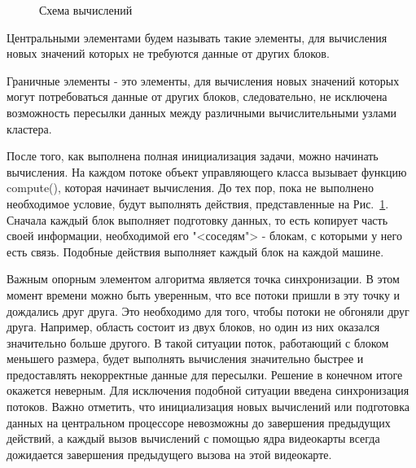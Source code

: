 \documentclass[a4paper, 14pt]{extarticle}
\theoremstyle{definition}
\begin{document}
\begin{figure}[h]
	\caption{Схема вычислений}
	\label{ris:scheme}
\end{figure}

\par Центральными элементами будем называть такие элементы, для вычисления новых значений которых не требуются данные от других блоков.

\par Граничные элементы - это элементы, для вычисления новых значений которых могут потребоваться данные от других блоков, следовательно, не исключена возможность пересылки данных между различными вычислительными узлами кластера.

\par После того, как выполнена полная инициализация задачи, можно начинать вычисления. На каждом потоке объект управляющего класса вызывает функцию compute(), которая начинает вычисления. До тех пор, пока не выполнено необходимое условие, будут выполнять действия, представленные на Рис.~\ref{ris:scheme}. Сначала каждый блок выполняет подготовку данных, то есть копирует часть своей информации, необходимой его  "<соседям"> - блокам, с которыми у него есть связь. Подобные действия выполняет каждый блок на каждой машине.

\par Важным опорным элементом алгоритма является точка синхронизации. В этом момент времени можно быть уверенным, что все потоки пришли в эту точку и дождались друг друга. Это необходимо для того, чтобы потоки не обгоняли друг друга. Например, область состоит из двух блоков, но один из них оказался значительно больше другого. В такой ситуации поток, работающий с блоком меньшего размера, будет выполнять вычисления значительно быстрее и предоставлять некорректные данные для пересылки. Решение в конечном итоге окажется неверным. Для исключения подобной ситуации введена синхронизация потоков. Важно отметить, что инициализация новых вычислений или подготовка данных на центральном процессоре невозможны до завершения предыдущих действий, а каждый вызов вычислений с помощью ядра видеокарты всегда дожидается завершения предыдущего вызова на этой видеокарте.
\end{document}
